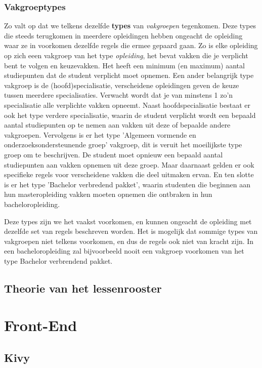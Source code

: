\subsubsection{Vakgroeptypes}
Zo valt op dat we telkens dezelfde \textbf{types} van \emph{vakgroepen} tegenkomen. 
Deze types die steeds terugkomen in meerdere opleidingen hebben ongeacht de opleiding waar ze in voorkomen dezelfde regels die ermee gepaard gaan.
Zo is elke opleiding op zich eeen vakgroep van het type \emph{opleiding}, het bevat vakken die je verplicht bent te volgen en keuzevakken. Het heeft een minimum (en maximum) aantal studiepunten dat de student verplicht moet opnemen.
Een ander belangrijk type vakgroep is de (hoofd)specialisatie, verscheidene opleidingen geven de keuze tussen meerdere specialisaties. Verwacht wordt dat je van minstens 1 zo'n specialisatie alle verplichte vakken opneemt.
Naast hoofdspecialisatie bestaat er ook het type verdere specialisatie, waarin de student verplicht wordt een bepaald aantal studiepunten op te nemen aan vakken uit deze of bepaalde andere vakgroepen. 
Vervolgens is er het type 'Algemeen vormende en onderzoeksondersteunende groep' vakgroep, dit is veruit het moeilijkste type groep om te beschrijven. De student moet opnieuw een bepaald aantal studiepunten aan vakken opnemen uit deze groep. Maar daarnaast gelden er ook specifieke regels voor verscheidene vakken die deel uitmaken ervan.
En ten slotte is er het type 'Bachelor verbredend pakket', waarin studenten die beginnen aan hun masteropleiding vakken moeten opnemen die ontbraken in hun bacheloropleiding.

Deze types zijn we het vaakst voorkomen, en kunnen ongeacht de opleiding met dezelfde set van regels beschreven worden. Het is mogelijk dat sommige types van vakgroepen niet telkens voorkomen, en dus de regels ook niet van kracht zijn. In een bacheloropleiding zal bijvoorbeeld nooit een vakgroep voorkomen van het type Bachelor verbrendend pakket. 

\subsection{Theorie van het lessenrooster}

\section{Front-End}

\subsection{Kivy}

